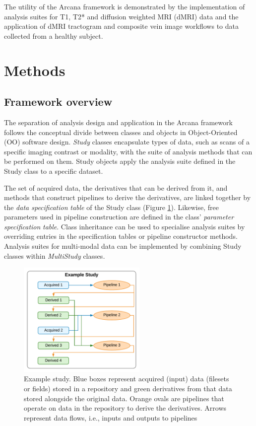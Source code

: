 \documentclass[smallextended]{svjour3}       %
\begin{document}

The utility of the Arcana framework is demonstrated by the
implementation of analysis suites for T1, T2* and diffusion weighted MRI
(dMRI) data and the application of dMRI tractogram \citep{tournier_mrtrix:_2012} and
composite vein image \citep{ward_combining_2018} workflows to data collected from a
healthy subject.

\section*{Methods}
\label{methods}

\subsection*{Framework overview}
\label{framework-overview}

The separation of analysis design and application in the Arcana
framework follows the conceptual divide between classes and objects in
Object-Oriented (OO) software design. \emph{Study} classes encapsulate
types of data, such as scans of a specific imaging
contrast or modality, with the suite of analysis methods that can be performed on
them. Study objects apply the analysis suite defined in
the Study class to a specific dataset.

The set of acquired data, the derivatives that can be derived from it,
and methods that construct pipelines to derive the derivatives, are
linked together by the \emph{data specification} \emph{table} of the
Study class (Figure \ref{fig:example_study}). Likewise, free parameters used in pipeline
construction are defined in the class' \emph{parameter specification}
\emph{table}. Class inheritance can be used to specialise analysis
suites by overriding entries in the specification tables or pipeline
constructor methods. Analysis suites for multi-modal data can be
implemented by combining Study classes within \emph{MultiStudy}
classes\emph{.}

\begin{figure}
    \centering
    \includegraphics[width=0.55\textwidth]{figures/example_study}
  \caption{Example study. Blue boxes represent acquired (input)
data (filesets or fields) stored in a repository and green derivatives
from that data stored alongside the original data. Orange ovals are
pipelines that operate on data in the repository to derive the
derivatives. Arrows represent data flows, i.e., inputs and outputs to
pipelines}
\label{fig:example_study}
\end{figure}
\end{document}
